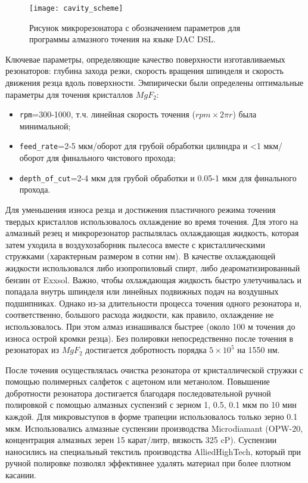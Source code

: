 \begin{figure}[ht]
\centering
  \texttt{[image: cavity\_scheme]}
  \caption{Рисунок микрорезонатора с обозначением параметров для программы алмазного точения на языке DAC DSL.}
  \label{cavity_scheme}
\end{figure}

Ключевае параметры, определяющие качество поверхности изготавливаемых резонаторов: глубина захода резки, скорость вращения шпинделя и скорость движения резца вдоль поверхности. Эмпирически были определены оптимальные параметры для точения кристаллов $MgF_2$:

\begin{itemize}
    \item \texttt{rpm}=300-1000, т.ч. линейная скорость точения ($rpm\times 2\pi r$) была минимальной;
    \item \texttt{feed\_rate}=2-5 мкм/оборот для грубой обработки цилиндра и <1 мкм/оборот для финального чистового прохода;
    \item \texttt{depth\_of\_cut}=2-4 мкм для грубой обработки и 0.05-1 мкм для финального прохода.
\end{itemize}

Для уменьшения износа резца и достижения пластичного режима точения твердых кристаллов использовалось охлаждение во время точения. Для этого на алмазный резец и микрорезонатор распылялась охлаждающая жидкость, которая затем уходила в воздухозаборник пылесоса вместе с кристаллическими стружками (характерным размером в сотни нм). В качестве охлаждающей жидкости использовался либо изопропиловый спирт, либо деароматизированный бензин от Exxsol. Важно, чтобы охлаждающая жидкость быстро улетучивалась и попадала внутрь шпинделя или линейных подвижных подач на воздушных подшипниках. Однако из-за длительности процесса точения одного резонатора и, соответственно, большого расхода жидкости, как правило, охлаждение не использовалось. При этом алмаз изнашивался быстрее (около 100 м точения до износа острой кромки резца). Без полировки непосредственно после точения в резонаторах из $MgF_2$ достигается добротность порядка $5\times10^5$ на 1550 нм.

После точения осуществлялась очистка резонатора от кристаллической стружки с помощью полимерных салфеток с ацетоном или метанолом. Повышение добротности резонатора достигается благодаря последовательной ручной полировкой с помощью алмазных суспензий с зерном 1, 0.5, 0.1 мкм по 10 мин каждой. Для микровыступов в форме трапеции использовалось только зерно 0.1 мкм. Использовались алмазные суспензии производства Microdiamant (OPW-20, концентрация алмазных зерен 15 карат/литр, вязкость 325 cP). Суспензии наносились на специальный текстиль производства AlliedHighTech, который при ручной полировке позволял эффективнее удалять материал при более плотном касании.
 
